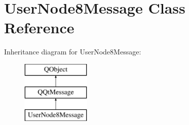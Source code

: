 \hypertarget{class_user_node8_message}{}\section{User\+Node8\+Message Class Reference}
\label{class_user_node8_message}
Inheritance diagram for User\+Node8\+Message\+:\begin{figure}[H]
\begin{center}
\leavevmode
\includegraphics[height=3.000000cm]{class_user_node8_message}
\end{center}
\end{figure}
